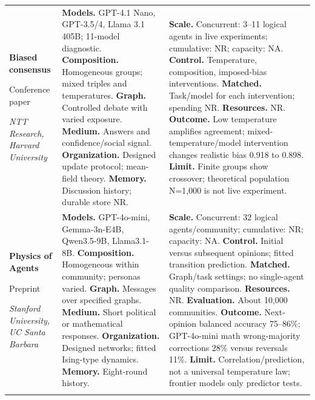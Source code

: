 \begin{longtable}{@{}>{\raggedright\arraybackslash}p{}>{\raggedright\arraybackslash}p{}>{\raggedright\arraybackslash}p{}@{}}
\textbf{Biased consensus}\par \citep{okawa-biased-consensus}\par Conference paper\par\emph{NTT Research, Harvard University} & \textbf{Models.} GPT-4.1 Nano, GPT-3.5/4, Llama 3.1 405B; 11-model diagnostic. \textbf{Composition.} Homogeneous groups; mixed triples and temperatures. \textbf{Graph.} Controlled debate with varied exposure. \textbf{Medium.} Answers and confidence/social signal. \textbf{Organization.} Designed update protocol; mean-field theory. \textbf{Memory.} Discussion history; durable store NR. & \textbf{Scale.} Concurrent: 3--11 logical agents in live experiments; cumulative: NR; capacity: NA. \textbf{Control.} Temperature, composition, imposed-bias interventions. \textbf{Matched.} Task/model for each intervention; spending NR. \textbf{Resources.} NR. \textbf{Outcome.} Low temperature amplifies agreement; mixed-temperature/model intervention changes realistic bias 0.918 to 0.898. \textbf{Limit.} Finite groups show crossover; theoretical population N=1,000 is not live experiment. \\ \addlinespace[5pt]
\textbf{Physics of Agents}\par \citep{physics-of-agents}\par Preprint\par\emph{Stanford University, UC Santa Barbara} & \textbf{Models.} GPT-4o-mini, Gemma-3n-E4B, Qwen3.5-9B, Llama3.1-8B. \textbf{Composition.} Homogeneous within community; personas varied. \textbf{Graph.} Messages over specified graphs. \textbf{Medium.} Short political or mathematical responses. \textbf{Organization.} Designed networks; fitted Ising-type dynamics. \textbf{Memory.} Eight-round history. & \textbf{Scale.} Concurrent: 32 logical agents/community; cumulative: NR; capacity: NA. \textbf{Control.} Initial versus subsequent opinions; fitted transition prediction. \textbf{Matched.} Graph/task settings; no single-agent quality comparison. \textbf{Resources.} NR. \textbf{Evaluation.} About 10,000 communities. \textbf{Outcome.} Next-opinion balanced accuracy 75--86\%; GPT-4o-mini math wrong-majority corrections 28\% versus reversals 11\%. \textbf{Limit.} Correlation/prediction, not a universal temperature law; frontier models only predictor tests. \\ \addlinespace[5pt]

\end{longtable}

